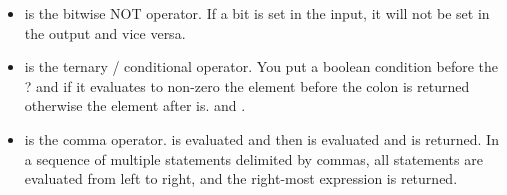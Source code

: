 \begin{itemize}
	\item \keyword{~~} is the bitwise NOT operator.
    If a bit is set in the input, it will not be set in the output and vice versa.
	\item {} is the ternary / conditional operator.
    You put a boolean condition before the ? and if it evaluates to non-zero the element before the colon is returned otherwise the element after is.
     and .
	\item {} is the comma operator.
     is evaluated and then  is evaluated and  is returned.
    In a sequence of multiple statements delimited by commas, all statements are evaluated from left to right, and the right-most expression is returned.
\end{itemize}


